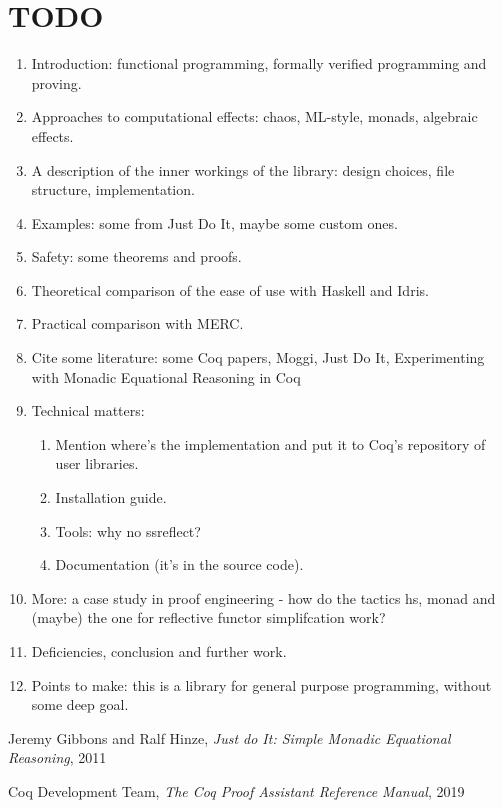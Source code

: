 \documentclass[declaration,inz,english,shortabstract]{iithesis}
\begin{document}
\chapter{TODO}

\begin{enumerate}
    \item Introduction: functional programming, formally verified programming and proving.
    \item Approaches to computational effects: chaos, ML-style, monads, algebraic effects.
    \item A description of the inner workings of the library: design choices, file structure, implementation.
    \item Examples: some from Just Do It, maybe some custom ones.
    \item Safety: some theorems and proofs.
    \item Theoretical comparison of the ease of use with Haskell and Idris.
    \item Practical comparison with MERC.
    \item Cite some literature: some Coq papers, Moggi, Just Do It, Experimenting with Monadic Equational Reasoning in Coq
    \item Technical matters:
    \begin{enumerate}
        \item Mention where's the implementation and put it to Coq's repository of user libraries.
        \item Installation guide.
        \item Tools: why no ssreflect?
        \item Documentation (it's in the source code).
    \end{enumerate}
    \item More: a case study in proof engineering - how do the tactics hs, monad and (maybe) the one for reflective functor simplifcation work?
    \item Deficiencies, conclusion and further work.
    \item Points to make: this is a library for general purpose programming, without some deep goal.
\end{enumerate}


\begin{thebibliography}{1}

        Jeremy Gibbons and Ralf Hinze,
        \textit{Just do It: Simple Monadic Equational Reasoning},
        2011
    
        Coq Development Team,
        \textit{The Coq Proof Assistant Reference Manual},
        2019

\end{thebibliography}

\end{document}
